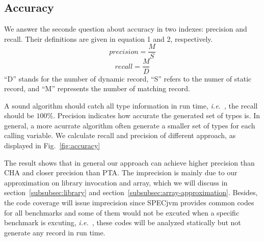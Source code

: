 \documentclass{fac}
\newcommand\ie{\textit{i.e.\ }}
\begin{document}
\subsection{Accuracy}\label{subsec:accuracy}
We answer the seconde question about accuracy in two indexes: precision and recall. Their definitions are given in equation 1 and 2, respectively.
\begin{equation}
precision =  \dfrac{M}{S}
\end{equation}
\begin{equation}
recall = \dfrac{M}{D}
\end{equation}
``D'' stands for the number of dynamic record, ``S'' refers to the numer of static record, and ``M'' represents the number of matching record.

A sound algorithm should catch all type information in run time, \ie, the recall should be $100\%$. Precision indicates how accurate the generated set of types is. In general, a more acurrate algorithm often generate a smaller set of types for each calling variable. We calculate recall and precision of different approach, as displayed in Fig.~\ref{fig:accuracy}

The result shows that in general our approach can achieve higher precision than CHA and closer precision than PTA. The imprecision is mainly due to our approximation on library invocation and array, which we will discuss in section~\ref{subsubsec:library} and section~\ref{subsubsec:array-approximation}. Besides, the code coverage will issue imprecision since SPECjvm provides common codes for all benchmarks and some of them would not be excuted when a specific benchmark is excuting, \ie, these codes will be analyzed statically but not generate any record in run time.
\end{document}
